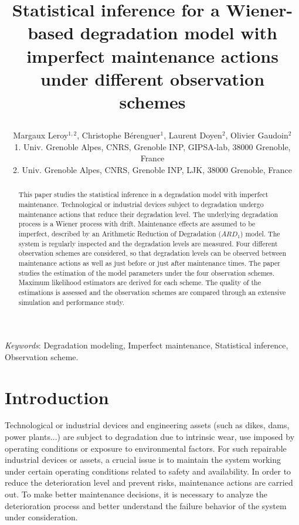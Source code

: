 
\usepackage{soul}



\title{Statistical inference for a Wiener-based degradation model with imperfect maintenance actions under different observation schemes
\author{Margaux {\sc Leroy}$^{1,2}$, Christophe {\sc B\'erenguer}$^{1}$, Laurent {\sc Doyen}$^{2}$, Olivier {\sc Gaudoin}$^{2}$\\
1. Univ. Grenoble Alpes, CNRS, Grenoble INP, GIPSA-lab, 38000 Grenoble, France\\
2. Univ. Grenoble Alpes, CNRS, Grenoble INP, LJK, 38000 Grenoble, France
}}

\maketitle

\begin{abstract}

This paper studies the statistical inference in a degradation model with imperfect maintenance. Technological or industrial devices subject to degradation undergo maintenance actions that reduce their degradation level. The underlying degradation process is a Wiener process with drift. Maintenance effects are assumed to be imperfect, described by an Arithmetic Reduction of Degradation ($ARD_1$) model. The system is regularly inspected and the degradation levels are measured.  
Four different observation schemes are considered, so that degradation levels can be observed between maintenance actions as well as just before or just after maintenance times.
The paper studies the estimation of the model parameters under the four observation schemes. Maximum likelihood estimators are derived for each scheme.
The quality of the estimations is assessed and the observation schemes are compared through an extensive simulation and performance study.

\end{abstract}

{\it Keywords}: Degradation modeling, Imperfect maintenance, Statistical inference, Observation scheme.


\section{Introduction}
\label{section:intro}

Technological or industrial devices and engineering assets (such as dikes, dams, power plants...) are subject to degradation due to intrinsic wear, use imposed by operating conditions or exposure to environmental factors. For such repairable industrial devices or assets, a crucial issue is to maintain the system working under certain operating conditions related to safety and availability. In order to reduce the deterioration level and prevent risks, maintenance actions are carried out. 
To make better maintenance decisions, it is necessary to analyze the deterioration process and better understand the failure behavior of the system under consideration. 

